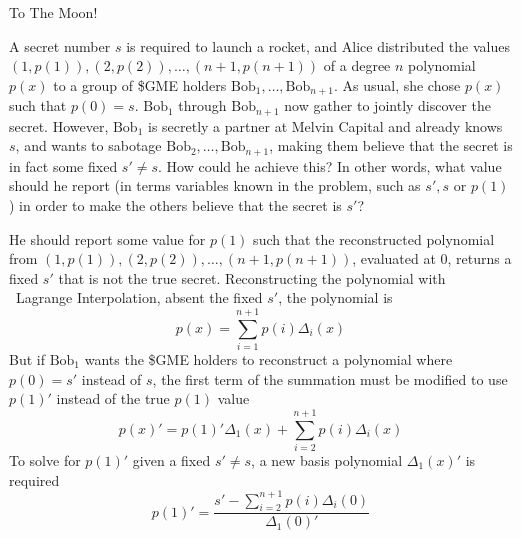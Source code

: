 \begin{homeworkProblem}{To The Moon!}

    A secret number $s$ is required to launch a rocket, and Alice distributed 
    the values $(1,p(1)), (2,p(2)), \dots, 
    (n+1,p(n+1))$ of a degree $n$ polynomial $p(x)$ to a group of 
    \$GME holders $\text{Bob}_1, \dots, \text{Bob}_{n+1}$. As usual, she chose 
    $p(x)$ such that $p(0) = s$. $\text{Bob}_1$ through $\text{Bob}_{n+1}$ now 
    gather to jointly discover the secret. However, $\text{Bob}_1$ is secretly 
    a partner at Melvin Capital and already knows $s$, and wants to sabotage 
    $\text{Bob}_2,\dots, \text{Bob}_{n+1}$, making them believe that the secret 
    is in fact some fixed $s' \neq s$. How could he achieve this? In other 
    words, what value should he report (in terms variables known in the 
    problem, such as $s', s$ or $p(1)$) in order to make the others believe 
    that the secret is $s'$?

    \solution
    He should report some value for $p(1)$ such that the reconstructed polynomial
    from $(1, p(1)), (2, p(2)), \dots, (n+1, p(n+1))$, evaluated at 0, returns a
    fixed $s'$ that is not the true secret. Reconstructing the polynomial with \
    Lagrange Interpolation, absent the fixed $s'$, the polynomial is
    \[
        p(x) = \sum_{i=1}^{n+1} p(i) \Delta_i(x)
    \]
    But if $\text{Bob}_1$ wants the \$GME holders to reconstruct a polynomial
    where $p(0) = s'$ instead of $s$, the first term of the summation must be
    modified to use $p(1)'$ instead of the true $p(1)$ value
    \[
        p(x)' = p(1)'\Delta_1(x) + \sum_{i=2}^{n+1} p(i) \Delta_i(x)
    \]
    To solve for $p(1)'$ given a fixed $s' \not = s$, a new basis polynomial 
    $\Delta_1(x)'$ is required
    \[
        p(1)' = \frac{s' - \sum_{i=2}^{n+1} p(i)\Delta_i(0)}{\Delta_1(0)'}
    \]
    


\end{homeworkProblem}
